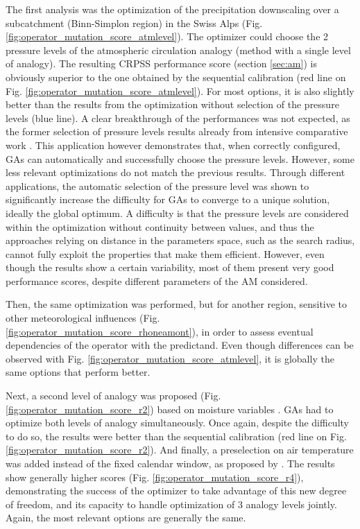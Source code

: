 \documentclass{ametsoc}
\begin{document}
The first analysis was the optimization of the precipitation downscaling over a subcatchment (Binn-Simplon region) in the Swiss Alps (Fig. \ref{fig:operator_mutation_score_atmlevel}). The optimizer could choose the 2 pressure levels of the atmospheric circulation analogy (method with a single level of analogy). The resulting CRPSS performance score (section \ref{sec:am}) is obviously superior to the one obtained by the sequential calibration (red line on Fig. \ref{fig:operator_mutation_score_atmlevel}). For most options, it is also slightly better than the results from the optimization without selection of the pressure levels (blue line). A clear breakthrough of the performances was not expected, as the former selection of pressure levels results already from intensive comparative work \citep{Bontron2004}. This application however demonstrates that, when correctly configured, GAs can automatically and successfully choose the pressure levels. However, some less relevant optimizations do not match the previous results. Through different applications, the automatic selection of the pressure level was shown to significantly increase the difficulty for GAs to converge to a unique solution, ideally the global optimum. A difficulty is that the pressure levels are considered within the optimization without continuity between values, and thus the approaches relying on distance in the parameters space, such as the search radius, cannot fully exploit the properties that make them efficient. However, even though the results show a certain variability, most of them present very good performance scores, despite different parameters of the AM considered.

Then, the same optimization was performed, but for another region, sensitive to other meteorological influences (Fig. \ref{fig:operator_mutation_score_rhoneamont}), in order to assess eventual dependencies of the operator with the predictand. Even though differences can be observed with Fig. \ref{fig:operator_mutation_score_atmlevel}, it is globally the same options that perform better.

Next, a second level of analogy was proposed (Fig. \ref{fig:operator_mutation_score_r2}) based on moisture variables \citep[see][]{Bontron2004}. GAs had to optimize both levels of analogy simultaneously. Once again, despite the difficulty to do so, the results were better than the sequential calibration (red line on Fig. \ref{fig:operator_mutation_score_r2}). And finally, a preselection on air temperature was added instead of the fixed calendar window, as proposed by \cite{BenDaoud2016}. The results show generally higher scores (Fig. \ref{fig:operator_mutation_score_r4}), demonstrating the success of the optimizer to take advantage of this new degree of freedom, and its capacity to handle optimization of 3 analogy levels jointly. Again, the most relevant options are generally the same.
\end{document}
